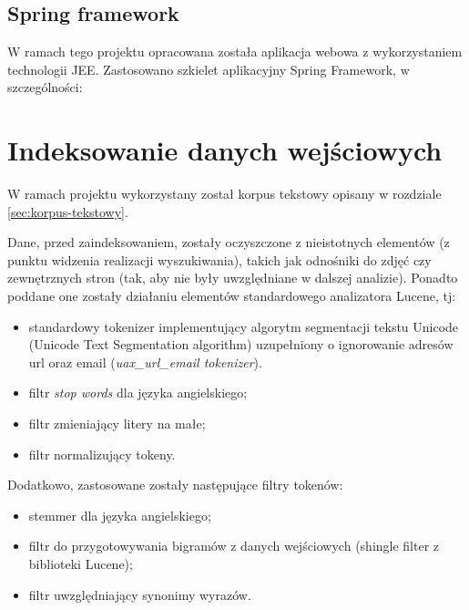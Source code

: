 \documentclass[runningheads]{llncs}
\begin{document}
\subsection{Spring framework}

W ramach tego projektu opracowana została aplikacja webowa z
wykorzystaniem technologii JEE. Zastosowano szkielet aplikacyjny
Spring Framework, w szczególności:
\section{Indeksowanie danych wejściowych}
\label{sec:indeksowanie-danych-wejsciowych}
W ramach projektu wykorzystany został korpus tekstowy opisany w
rozdziale \ref{sec:korpus-tekstowy}.

Dane, przed zaindeksowaniem, zostały oczyszczone z nieistotnych
elementów (z punktu widzenia realizacji wyszukiwania), takich jak
odnośniki do zdjęć czy zewnętrznych stron (tak, aby nie były
uwzględniane w dalszej analizie). Ponadto poddane one zostały działaniu
elementów standardowego analizatora Lucene, tj:
\begin{itemize}
\item standardowy tokenizer implementujący algorytm segmentacji tekstu
  Unicode (Unicode Text Segmentation algorithm) uzupełniony o ignorowanie
  adresów url oraz email (\emph{uax\_url\_email tokenizer}). 
\item filtr \emph{stop words} dla języka angielskiego;
\item filtr zmieniający litery na małe;
\item filtr normalizujący tokeny.

\end{itemize}
Dodatkowo, zastosowane zostały następujące filtry tokenów:
\begin{itemize}
\item stemmer dla języka angielskiego;
\item filtr do przygotowywania bigramów z danych wejściowych (shingle
  filter z biblioteki Lucene);
\item filtr uwzględniający synonimy wyrazów.
\end{itemize}
\end{document}
